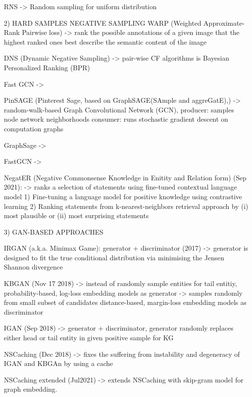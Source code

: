     RNS
        -> Random sampling for uniform distribution
    
    
2) HARD SAMPLES NEGATIVE SAMPLING
    WARP (Weighted Approximate-Rank Pairwise loss)
        -> rank the possible annotations of a given image that the highest ranked ones best describe the semantic content of the image
    
    DNS (Dynamic Negative Sampling)
         -> pair-wise CF algorithms is Bayesian Personalized Ranking (BPR)

    Fast GCN
        ->
        
    PinSAGE (Pinterest Sage, based on GraphSAGE(SAmple and aggreGatE),)
        -> random-walk-based Graph Convolutional Network (GCN),
        producer: samples node network neighborhoods
        consumer: runs stochastic gradient descent on computation graphs    

    GraphSage
        ->
        
    FastGCN
        -> 

    NegatER (Negative Commonsense Knowledge in Enitity and Relation form) (Sep 2021):
        -> ranks a selection of statements using fine-tuned contextual language model
        1) Fine-tuning a language model for positive knowledge using contrastive learning
        2) Ranking statements from k-nearest-neighbors retrieval approach by (i) most plausible or (ii) most surprising statements
    
    
    
    
3) GAN-BASED APPROACHES
    
    IRGAN (a.k.a. Minimax Game): generator + discriminator  (2017) 
        -> generator is designed to fit the true conditional distribution via minimising the Jensen Shannon divergence
    
    KBGAN (Nov 17 2018)
        -> instead of randomly sample entities for tail entitiy,
        probability-based, log-loss embedding models as generator
        -> samples randomly from small subset of candidates
        distance-based, margin-loss embedding models as discriminator
    
    IGAN (Sep 2018) 
        -> generator + discriminator, generator randomly replaces either head or tail entity in given positive sample for KG
    
    NSCaching (Dec 2018)
        -> fixes the suffering from instability and degeneracy of IGAN and KBGAn by using a cache

    NSCaching extended (Jul2021)
        ->  extends NSCaching with skip-gram model for graph embedding. 
    
